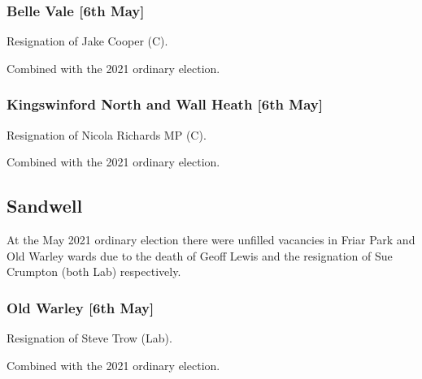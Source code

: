 \documentclass[a4paper,openany]{book}
\begin{document}
\begin{resultsiii}
\subsubsection*{Belle Vale \hspace*{\fill}\nolinebreak[1]%
	\enspace\hspace*{\fill}
	[6th May]}


Resignation of Jake Cooper (C).

Combined with the 2021 ordinary election.

\subsubsection*{Kingswinford North and Wall Heath \hspace*{\fill}\nolinebreak[1]%
	\enspace\hspace*{\fill}
	[6th May]}


Resignation of Nicola Richards MP (C).

Combined with the 2021 ordinary election.

\subsection*{Sandwell}

At the May 2021 ordinary election there were unfilled vacancies in Friar Park and Old Warley wards due to the death of Geoff Lewis and the resignation of Sue Crumpton (both Lab) respectively.

\subsubsection*{Old Warley \hspace*{\fill}\nolinebreak[1]%
	\enspace\hspace*{\fill}
	[6th May]}


Resignation of Steve Trow (Lab).

Combined with the 2021 ordinary election.


\end{resultsiii}
\end{document}
